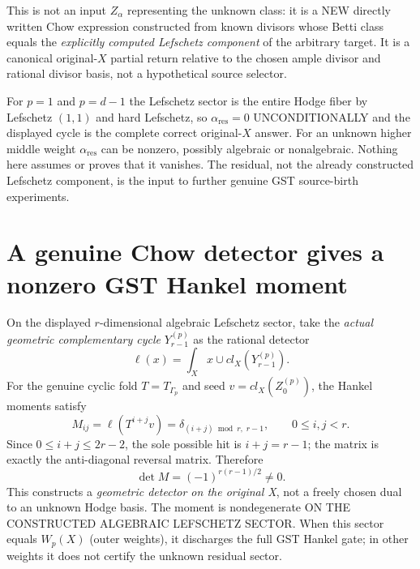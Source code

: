 \documentclass[11pt]{article}
\begin{document}
This is not an input $Z_\alpha$ representing the unknown class:
it is a NEW directly written Chow expression constructed from
known divisors whose Betti class equals the \emph{explicitly computed
Lefschetz component} of the arbitrary target.
It is a canonical original-$X$ partial return relative to the
chosen ample divisor and rational divisor basis, not a hypothetical
source selector.

For $p=1$ and $p=d-1$ the Lefschetz sector is the entire Hodge
fiber by Lefschetz $(1,1)$ and hard Lefschetz, so
$\alpha_{\mathrm{res}}=0$ UNCONDITIONALLY and the displayed cycle
is the complete correct original-$X$ answer.
For an unknown higher middle weight $\alpha_{\mathrm{res}}$
can be nonzero, possibly algebraic or nonalgebraic.
Nothing here assumes or proves that it vanishes.
The residual, not the already constructed Lefschetz component,
is the input to further genuine GST source-birth experiments.

\section{A genuine Chow detector gives a nonzero GST Hankel moment}
On the displayed $r$-dimensional algebraic Lefschetz sector,
take the \emph{actual geometric complementary cycle}
$Y_{r-1}^{(p)}$ as the rational detector
\[
\ell(x)=\int_X x\cup cl_X(Y_{r-1}^{(p)}).
\]
For the genuine cyclic fold $T=T_{\Gamma_p}$ and seed
$v=cl_X(Z_0^{(p)})$, the Hankel moments satisfy
\[
M_{ij}=\ell(T^{i+j}v)
=\delta_{(i+j)\bmod r,\;r-1},
\qquad 0\le i,j<r.
\]
Since $0\le i+j\le2r-2$, the sole possible hit is
$i+j=r-1$; the matrix is exactly the
anti-diagonal reversal matrix. Therefore
\[
\boxed{\det M=(-1)^{r(r-1)/2}\ne0.}
\]
This constructs a \emph{geometric detector on the original X},
not a freely chosen dual to an unknown Hodge basis.
The moment is nondegenerate ON THE CONSTRUCTED ALGEBRAIC
LEFSCHETZ SECTOR. When this sector equals $W_p(X)$
(outer weights), it discharges the full GST Hankel gate;
in other weights it does not certify the unknown residual sector.
\end{document}
